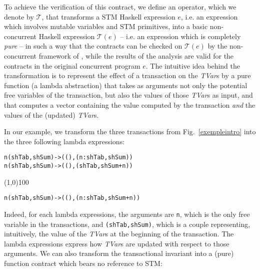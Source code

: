 \documentclass[submission,copyright,creativecommons]{eptcs}
\newcommand{\pt}{\ensuremath{\mathcal{T}}}
\begin{document}
To achieve the verification of this contract, we define an operator, which we denote by  $\pt$, that transforms a STM Haskell expression $e$, i.e. an expression which involves mutable variables and STM primitives, into a basic non-concurrent Haskell  expression $\pt(e)$ -- i.e. an expression which is completely \emph{pure} -- in such a way that the contracts can be checked on $\pt(e)$ by the non-concurrent framework of \cite{static-contract-checking}, while the results of the analysis are valid for the contracts in the original concurrent program $e$.
The intuitive idea behind the transformation is to represent the effect of a transaction on the \emph{TVar}s by a pure function (a lambda abstraction) that takes as arguments not only the potential free variables of the transaction, but also the values of those \emph{TVar}s as input, and that computes a vector containing the value computed by the transaction \emph{and} the values of the (updated) \emph{TVar}s. 

\newcommand\bslash{\symbol{`\\}}

In our example, we transform the three transactions from Fig.~\ref{exempleintro} into the three following lambda expressions:

\begin{footnotesize}
\begin{alltt}
{\bslash}n (shTab,shSum) -> ((),(n:shTab,shSum))    
{\bslash}n (shTab,shSum) -> ((),(shTab,shSum+n))    
\end{alltt}
\end{footnotesize}
\begin{center}
\line(1,0){100}
\end{center}
\begin{footnotesize}
\begin{alltt}
{\bslash}n (shTab,shSum) -> ((),(n:shTab,shSum+n))  
\end{alltt}
\end{footnotesize}
Indeed, for each lambda expressions, the arguments are \texttt{n}, which is the only free variable in the transactions, and \texttt{(shTab,shSum)}, which is a couple representing, intuitively, the value of the \emph{TVar}s at the beginning of the transaction. The lambda expressions express how \emph{TVar}s are updated with respect to those arguments.   
We can also transform the transactional invariant into a (pure) function contract
which bears no reference to STM:
\end{document}
